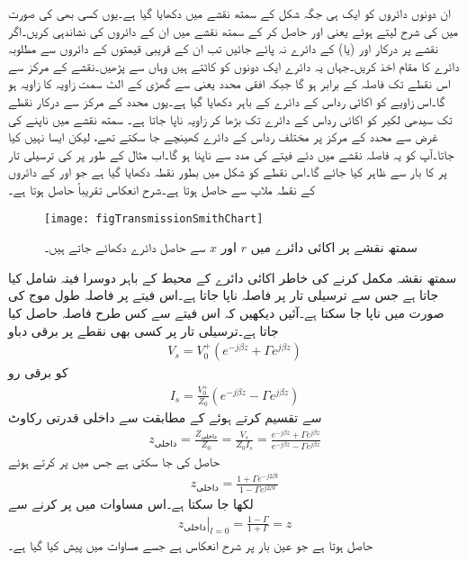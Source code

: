 ان دونوں دائروں کو ایک ہی جگہ شکل  کے سمتھ نقشے میں دکھایا گیا ہے۔یوں کسی بھی  کی صورت میں  کی شرح لیتے ہوئے  یعنی  اور  حاصل کر کے  سمتھ نقشے میں ان کے دائروں کی نشاندہی کریں۔اگر نقشے پر درکار  اور (یا)  کے دائرے نہ پائے جائیں تب ان کے قریبی قیمتوں کے دائروں سے مطلوبہ دائرے کا مقام اخذ کریں۔جہاں یہ دائرے  ایک دونوں کو کاٹتے ہیں وہاں سے   پڑھیں۔نقشے  کے مرکز  سے  اس نقطے تک فاصلہ  کے برابر ہو گا جبکہ افقی محدد یعنی  سے گھڑی کے الٹ سمت زاویہ  کا زاویہ ہو گا۔اس زاویے کو اکائی رداس کے دائرے کے باہر دکھایا گیا ہے۔یوں محدد کے مرکز سے درکار نقطے تک سیدھی لکیر کو اکائی رداس کے دائرے تک بڑھا کر زاویہ ناپا جاتا ہے۔ سمتھ نقشے میں  ناپنے کی غرض سے محدد کے مرکز  پر مختلف رداس کے دائرے کھینچے جا سکتے تھے، لیکن ایسا نہیں کیا جاتا۔آپ کو یہ فاصلہ نقشے میں دئے فیتے کی مدد سے ناپنا ہو گا۔اب مثال کے طور پر  کی ترسیلی تار پر  کا بار  سے ظاہر کیا جائے گا۔اس نقطے کو شکل میں بطور نقطہ  دکھایا گیا ہے جو  اور  کے دائروں کے نقطہ ملاپ سے حاصل ہوتا ہے۔شرح انعکاس تقریباً   حاصل ہوتا ہے۔
\begin{figure}
\centering
\texttt{[image: figTransmissionSmithChart]}
\caption{سمتھ نقشے پر اکائی دائرے میں $r$ اور $x$ سے حاصل دائرے دکھائے جاتے ہیں۔}
\label{شکل_ترسیلی_سمتھ-نقشہ_پ}
\end{figure}

سمتھ نقشہ مکمل کرنے کی خاطر اکائی دائرے کے  محیط کے باہر دوسرا فیتہ شامل کیا جاتا ہے جس سے ترسیلی تار پر فاصلہ ناپا جاتا ہے۔اس فیتے پر فاصلہ طول موج  کی صورت میں ناپا جا سکتا ہے۔آئیں دیکھیں کہ اس فیتے سے کس طرح فاصلہ حاصل کیا جاتا ہے۔ترسیلی تار پر کسی بھی نقطے پر برقی دباو
\begin{align*}
V_s=V_0^+ \left(e^{-j\beta z}+\Gamma e^{j \beta z} \right)
\end{align*}
کو برقی رو
\begin{align*}
I_s =\frac{V_0^+}{Z_0}\left(e^{-j\beta z}-\Gamma e^{j \beta z} \right)
\end{align*}
سے تقسیم کرتے ہوئے  کے مطابقت سے داخلی قدرتی رکاوٹ
\begin{align*}
z_{\text{داخلی}} = \frac{Z_{\text{داخلی}}}{Z_0}=\frac{V_s}{Z_0 I_s}=\frac{e^{-j\beta z}+\Gamma e^{j \beta z} }{e^{-j\beta z}-\Gamma e^{j \beta z} }
\end{align*}
حاصل کی جا سکتی ہے جس میں  پر کرتے ہوئے
\begin{align}\label{مساوات_ترسیلی_داخلی_رکاوٹ_سمتھ_الف}
z_{\text{داخلی}} =\frac{1+\Gamma e^{-j 2\beta l}}{1-\Gamma e^{j 2\beta l}}
\end{align}
لکھا جا سکتا ہے۔اس مساوات میں  پر کرنے سے
\begin{align}\label{مساوات_ترسیلی_داخلی_رکاوٹ_سمتھ_ب}
\left. z_{\text{داخلی}} \right|_{l=0}=\frac{1-\Gamma}{1+\Gamma} = z
\end{align}
حاصل ہوتا ہے جو عین بار پر شرح انعکاس ہے جسے مساوات  میں پیش کیا گیا ہے۔

